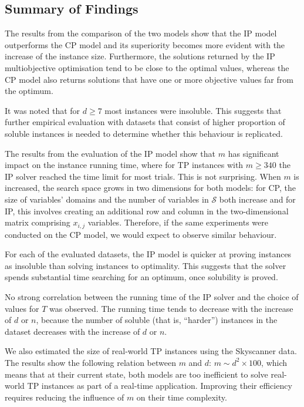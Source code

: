 \documentclass{mpaper}
\begin{document}
\subsection{Summary of Findings}
\label{experiments:summary}
\vspace{-1mm}
The results from the comparison of the two models show that the
IP model outperforms the CP model and its superiority becomes more evident with the increase of the instance size. Furthermore, the solutions returned by the IP multiobjective optimisation tend to be close to the optimal values, whereas the CP model also returns solutions that have one or more objective values far from the optimum.

It was noted that for $d \geq 7$ most instances were insoluble. This suggests that further empirical evaluation with datasets that consist of higher proportion of soluble instances is needed to determine whether this behaviour is replicated.

The results from the evaluation of the IP model show that $m$ has significant impact on the instance running time, where for TP instances with $m \geq 340$ the IP solver reached the time limit for most trials. This is not surprising. When $m$ is increased, the search space grows in two dimensions for both models: for CP, the size of variables' domains and the number of variables in $\mathcal{S}$ both increase and for IP, this involves creating an additional row and column in the two-dimensional matrix comprising $x_{i,j}$ variables. Therefore, if the same experiments were conducted on the CP model, we would expect to observe similar behaviour.

For each of the evaluated datasets, the IP model is quicker at proving instances as insoluble than solving instances to optimality. This suggests that the solver spends substantial time searching for an optimum, once solubility is proved.

No strong correlation between the running time of the IP solver and the choice of values for $T$ was observed. The running time tends to decrease with the increase of $d$ or $n$, because the number of soluble (that is, ``harder'') instances in the dataset decreases with the increase of $d$ or $n$.

We also estimated the size of real-world TP instances using the Skyscanner data. The results show the following relation between $m$ and $d$: $m \sim d^2 \times 100$, which means that at their current state, both models are too inefficient to solve real-world TP instances as part of a real-time application. Improving their efficiency requires reducing the influence of $m$ on their time complexity.
\end{document}
